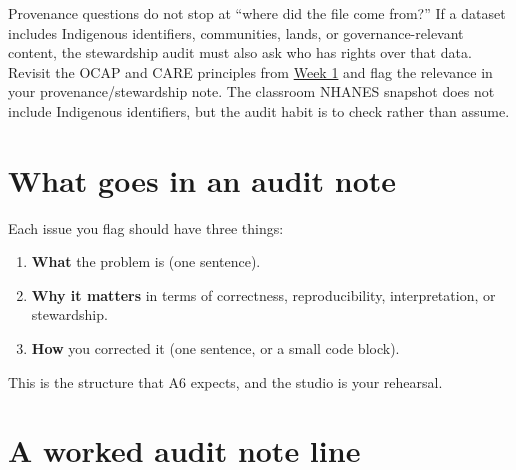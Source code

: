 \documentclass[
  letterpaper,
  DIV=11,
  numbers=noendperiod,
  oneside]{scrreprt}
\providecommand{\tightlist}{%
  \setlength{\itemsep}{0pt}\setlength{\parskip}{0pt}}
\begin{document}
\begin{tcolorbox}[enhanced jigsaw, title=\textcolor{quarto-callout-note-color}{\faInfo}\hspace{0.5em}{Stewardship includes Indigenous Data Sovereignty}, arc=.35mm, toptitle=1mm, colframe=quarto-callout-note-color-frame, toprule=.15mm, leftrule=.75mm, bottomtitle=1mm, opacityback=0, bottomrule=.15mm, coltitle=black, breakable, opacitybacktitle=0.6, titlerule=0mm, colback=white, left=2mm, colbacktitle=quarto-callout-note-color!10!white, rightrule=.15mm]

Provenance questions do not stop at ``where did the file come from?'' If
a dataset includes Indigenous identifiers, communities, lands, or
governance-relevant content, the stewardship audit must also ask who has
rights over that data. Revisit the OCAP and CARE principles from
\hyperref[indigenous-data-sovereignty]{Week 1} and flag the relevance in
your provenance/stewardship note. The classroom NHANES snapshot does not
include Indigenous identifiers, but the audit habit is to check rather
than assume.

\end{tcolorbox}

\section*{What goes in an audit note}\label{what-goes-in-an-audit-note}


Each issue you flag should have three things:

\begin{enumerate}
\def\labelenumi{\arabic{enumi}.}
\tightlist
\item
  \textbf{What} the problem is (one sentence).
\item
  \textbf{Why it matters} in terms of correctness, reproducibility,
  interpretation, or stewardship.
\item
  \textbf{How} you corrected it (one sentence, or a small code block).
\end{enumerate}

This is the structure that A6 expects, and the studio is your rehearsal.

\section*{A worked audit note line}\label{a-worked-audit-note-line}
\end{document}

